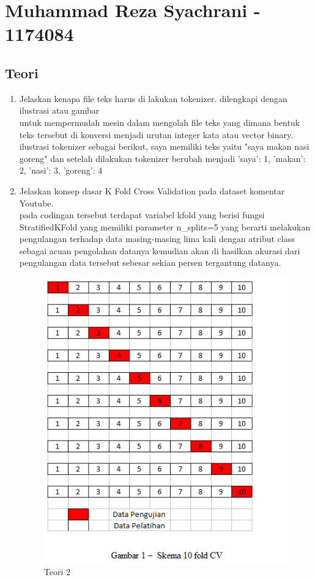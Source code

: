 \section{Muhammad Reza Syachrani - 1174084}
\subsection{Teori}
\begin{enumerate}

	\item Jelaskan kenapa ﬁle teks harus di lakukan tokenizer. dilengkapi dengan ilustrasi atau gambar
	\hfill\\
untuk mempermudah mesin dalam mengolah file teks yang dimana bentuk teks tersebut di konversi menjadi urutan integer kata atau vector binary. ilustrasi tokenizer sebagai berikut, saya memiliki teks yaitu "saya makan nasi goreng" dan setelah dilakukan tokenizer berubah menjadi {'saya': 1, 'makan': 2, 'nasi': 3, 'goreng': 4}

\item Jelaskan konsep dasar K Fold Cross Validation pada dataset komentar Youtube.
	\hfill\\
	pada codingan tersebut terdapat variabel kfold yang berisi fungsi StratifiedKFold yang memiliki parameter n\_splits=5 yang berarti melakukan pengulangan terhadap data masing-masing lima kali dengan atribut class sebagai acuan pengolahan datanya kemudian akan di hasilkan akurasi dari pengulangan data tersebut sebesar sekian persen tergantung datanya. 

\begin{figure}[H]
    \includegraphics[width=12cm]{figures/1174084/7/teori2.png}
    \centering
    \caption{Teori 2}
\end{figure}


\end{enumerate}

